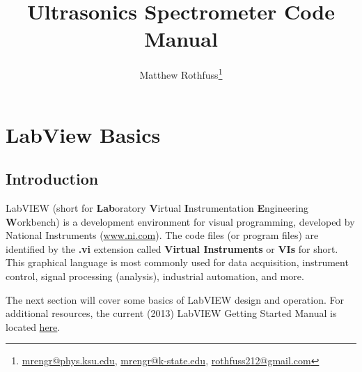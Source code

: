 \documentclass[letterpaper, twoside, openright]{report}
\begin{document}
\title{Ultrasonics Spectrometer Code Manual}
\author{Matthew Rothfuss\thanks{\href{mailto:mrengr@phys.ksu.edu}{mrengr@phys.ksu.edu}, \href{mailto:mrengr@k-state.edu}{mrengr@k-state.edu}, \href{mailto:rothfuss212@gmail.com}{rothfuss212@gmail.com}}}

\maketitle




\tableofcontents


\chapter{LabView Basics}

\section{Introduction}

LabVIEW	(short	for	\textbf{Lab}oratory	\textbf{V}irtual	\textbf{I}nstrumentation	\textbf{E}ngineering	\textbf{W}orkbench) is a development environment for visual programming, developed by National Instruments (\href{http://www.ni.com/}{www.ni.com}). The code files (or program files) are identified by the \textbf{.vi} extension called \textbf{Virtual Instruments} or \textbf{VIs} for short. This graphical language is most commonly used for data acquisition, instrument control, signal processing (analysis), industrial automation, and more.

The next section will cover some basics of LabVIEW design and operation. For additional resources, the current (2013) LabVIEW Getting Started Manual is located \href{http://www.ni.com/pdf/manuals/373427j.pdf}{here}.
\end{document}
